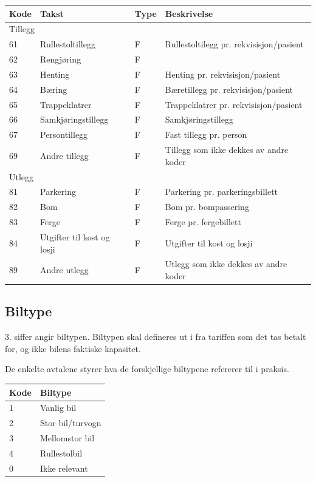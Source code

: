 \documentclass[a4paper,titlepage,norsk,11pt]{article}
\begin{document}
\begin{tabularx}{\textwidth}{|l|l|l|X|}
\hline
\textbf{Kode} & \textbf{Takst} & \textbf{Type} & \textbf{Beskrivelse} \\\hline
\multicolumn{4}{|l|}{Tillegg} \\\hline
61 & Rullestoltillegg & F & Rullestoltilegg pr. rekvisisjon/pasient \\\hline
62 & Rengjøring & F &  \\\hline
63 & Henting & F & Henting pr. rekvisisjon/pasient \\\hline
64 & Bæring & F & Bæretillegg pr. rekvisisjon/pasient \\\hline
65 & Trappeklatrer & F & Trappeklatrer pr. rekvisisjon/pasient \\\hline
66 & Samkjøringstillegg & F & Samkjøringstillegg \\\hline
67 & Persontillegg & F & Fast tillegg pr. person \\\hline
69 & Andre tillegg & F & Tillegg som ikke dekkes av andre koder \\\hline
\multicolumn{4}{|l|}{Utlegg} \\\hline
81 & Parkering & F & Parkering pr. parkeringsbillett \\\hline
82 & Bom & F & Bom pr. bompassering \\\hline
83 & Ferge & F & Ferge pr. fergebillett \\\hline
84 & Utgifter til kost og losji & F & Utgifter til kost og losji \\\hline
89 & Andre utlegg & F & Utlegg som ikke dekkes av andre koder \\\hline
\end{tabularx}

\subsection{Biltype}
3. siffer angir biltypen. Biltypen skal defineres ut i fra tariffen som det tas betalt for, og ikke bilens faktiske kapasitet.

De enkelte avtalene styrer hva de forskjellige biltypene refererer til i praksis.

\begin{tabularx}{\textwidth}{|l|X|}
\hline
\textbf{Kode} & \textbf{Biltype} \\\hline
1 & Vanlig bil \\\hline
2 & Stor bil/turvogn\\\hline
3 & Mellomstor bil \\\hline
4 & Rullestolbil \\\hline
0 & Ikke relevant \\\hline
\end{tabularx}
\end{document}

